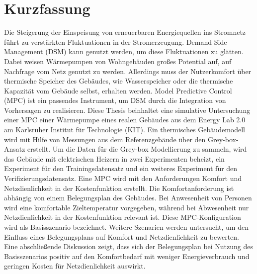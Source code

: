 \chapter{Kurzfassung}
\label{ch:kurzfassung}
Die Steigerung der Einspeisung von erneuerbaren Energiequellen ins Stromnetz führt zu verstärkten Fluktuationen in der Stromerzeugung. Demand Side Management (DSM) kann genutzt werden, um diese Fluktuationen zu glätten. Dabei weisen Wärmepumpen von Wohngebäuden großes Potential auf, auf Nachfrage vom Netz genutzt zu werden. Allerdings muss der Nutzerkomfort über thermische Speicher des Gebäudes, wie Wasserspeicher oder die thermische Kapazität vom Gebäude selbst, erhalten werden. Model Predictive Control (MPC) ist ein passendes Instrument, um DSM durch die Integration von Vorhersagen zu realisieren.\newline 
Diese Thesis beinhaltet eine simulative Untersuchung einer MPC einer Wärmepumpe eines realen Gebäudes aus dem Energy Lab 2.0 am Karlsruher Institut für Technologie (KIT). Ein thermisches Gebäudemodell wird mit Hilfe von Messungen aus dem Referenzgebäude über den Grey-box- Ansatz erstellt. Um die Daten für die Grey-box Modellierung zu sammeln, wird das Gebäude mit elektrischen Heizern in zwei Experimenten beheizt, ein Experiment für den Trainingsdatensatz und ein weiteres Experiment für den Verifizierungsdatensatz.\newline
Eine MPC wird mit den Anforderungen Komfort und Netzdienlichkeit in der Kostenfunktion erstellt. Die Komfortanforderung ist abhängig von einem Belegungsplan des Gebäudes. Bei Anwesenheit von Personen wird eine komfortable Zieltemperatur vorgegeben, während bei Abwesenheit nur Netzdienlichkeit in der Kostenfunktion relevant ist. Diese MPC-Konfiguration wird als Basisszenario bezeichnet.  Weitere Szenarien werden untersucht, um den Einfluss eines Belegungsplans auf Komfort und Netzdienlichkeit zu bewerten. Eine abschließende Diskussion zeigt, dass sich der Belegungsplan bei Nutzung des Basisszenarios positiv auf den Komfortbedarf mit weniger Energieverbrauch und geringen Kosten für Netzdienlichkeit auswirkt.



